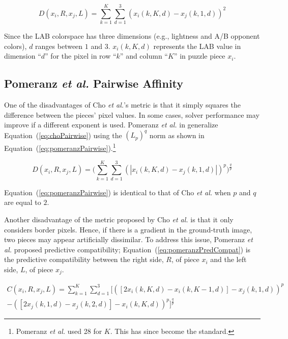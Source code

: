 \documentclass{report}
\def\eref#1{(\ref{#1})}
\begin{document}
\begin{equation} \label{eq:choPairwise}
D(x_i,R,x_j,L) = \sum_{k=1}^{K}\sum_{d=1}^{3}(x_i(k,K,d) - x_j(k,1,d))^2
\end{equation}

Since the LAB colorspace has three dimensions (e.g., lightness and A/B opponent colors), $d$ ranges between $1$ and $3$.  $x_i(k,K,d)$ represents the LAB value in dimension ``$d$'' for the pixel in row ``$k$'' and column ``$K$'' in puzzle piece $x_i$.

\subsection{Pomeranz \textit{et al.} Pairwise Affinity}\label{sec:pomeranzPairwiseAffinity}

One of the disadvantages of Cho \textit{et al.}'s metric is that it simply squares the difference between the pieces' pixel values.  In some cases, solver performance may improve if a different exponent is used.  Pomeranz \textit{et al.} in \cite{pomeranz2011} generalize Equation~\eref{eq:choPairwise} using the $(L_{p})^{q}$ norm as shown in Equation~\eref{eq:pomeranzPairwise}.\footnote{Pomeranz \textit{et al.} used 28 for $K$.  This has since become the standard.}

\begin{equation} \label{eq:pomeranzPairwise}
D(x_i,R,x_j,L) = \bigg(\sum_{k=1}^{K}\sum_{d=1}^{3}(|x_i(k,K,d) - x_j(k,1,d)|)^p\bigg)^{\frac{q}{p}}
\end{equation}

\noindent
Equation~\eref{eq:pomeranzPairwise} is identical to that of Cho \textit{et al.} when $p$ and $q$ are equal to $2$.

Another disadvantage of the metric proposed by Cho \textit{et al.} is that it only considers border pixels.  Hence, if there is a gradient in the ground-truth image, two pieces may appear artificially dissimilar.  To address this issue, Pomeranz \textit{et al.} proposed predictive compatibility; Equation~\eref{eq:pomeranzPredCompat} is the predictive compatibility between the right side, $R$, of piece $x_i$ and the left side, $L$, of piece $x_j$.  

\begin{equation} \label{eq:pomeranzPredCompat}
\begin{split}
C(x_i,R,x_j,L) = \sum_{k=1}^{K}\sum_{d=1}^{3}\Big[ ([2x_i(k, K, d) - x_i(k, K-1, d)] - x_j(k, 1, d))^p \\ - ([2x_j(k, 1, d) - x_j(k, 2, d)] - x_i(k, K, d))^p\Big]^{\frac{q}{p}}
\end{split}
\end{equation}
\end{document}
